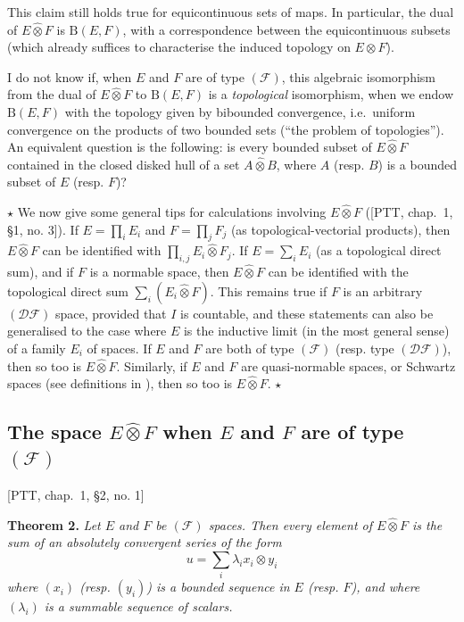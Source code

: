 \documentclass[british]{article}
\newenvironment{itenv}[1]
  {\phantomsection\par\smallskip\noindent\textbf{#1.}\itshape}
  {\par\smallskip}
\newcommand{\oldpage}[1]{\marginpar{\footnotesize$\Big\vert$ \textit{p.~#1}}}
\begin{document}
This claim still holds true for equicontinuous sets of maps. In
particular, the dual of \(E\hat{\otimes}F\) is \(\mathrm{B}(E,F)\), with
a correspondence between the equicontinuous subsets (which already
suffices to characterise the induced topology on \(E\otimes F\)).

I do not know if, when \(E\) and \(F\) are of type \((\mathscr{F})\),
this algebraic isomorphism from the dual of \(E\hat{\otimes}F\) to
\(\mathrm{B}(E,F)\) is a \emph{topological} isomorphism, when we endow
\(\mathrm{B}(E,F)\) with the topology given by bibounded convergence,
i.e.~uniform convergence on the products of two bounded sets (``the
problem of topologies''). An equivalent question is the following: is
every bounded subset of \(E\hat{\otimes}F\) contained in the closed
disked hull of a set \(A\hat{\otimes}B\), where \(A\) (resp. \(B\)) is a
bounded subset of \(E\) (resp. \(F\))?

\(\star\) We now give some general tips for calculations involving
\(E\hat{\otimes}F\) ({[}PTT, chap.~1, §1, no. 3{]}). If
\(E=\prod_i E_i\) and \(F=\prod_j F_j\) (as topological-vectorial
products), then \(E\hat{\otimes}F\) can be identified with
\(\prod_{i,j}E_i\hat{\otimes}F_j\). If \(E=\sum_i E_i\) (as a
topological direct sum), and if \(F\) is a normable space, then
\(E\hat{\otimes}F\) can be identified with the topological direct sum
\(\sum_i(E_i\hat{\otimes}F)\). This remains true if \(F\) is an
arbitrary \((\mathscr{DF})\) space, provided that \(I\) is countable,
and these statements can also be generalised to the case where \(E\) is
the inductive limit (in the most general sense) of a family \(E_i\) of
spaces. If \(E\) and \(F\) are both of type \((\mathscr{F})\) (resp.
type \((\mathscr{DF})\)), then so too is \(E\hat{\otimes}F\). Similarly,
if \(E\) and \(F\) are quasi-normable spaces, or Schwartz spaces (see
definitions in \autocite[Section 3]{6}), then so too is
\(E\hat{\otimes}F\). \(\star\)

\subsection{\texorpdfstring{The space \(E\hat{\otimes}F\) when \(E\) and
\(F\) are of type
\((\mathscr{F})\)}{The space E\textbackslash hat\{\textbackslash otimes\}F when E and F are of type (\textbackslash mathscr\{F\})}}\label{section-1.2}

{[}PTT, chap.~1, §2, no. 1{]}

\medskip
\oldpage{78}

\protect{}\label{section-1-theorem-2}
\begin{itenv}{Theorem 2}
Let \(E\) and \(F\) be \((\mathscr{F})\) spaces. Then every element of
\(E\hat{\otimes}F\) is the sum of an absolutely convergent series of the
form \[
  u = \sum_i \lambda_i x_i \otimes y_i
\] where \((x_i)\) (resp. \((y_i)\)) is a bounded sequence in \(E\)
(resp. \(F\)), and where \((\lambda_i)\) is a summable sequence of
scalars.

\end{itenv}
\end{document}
